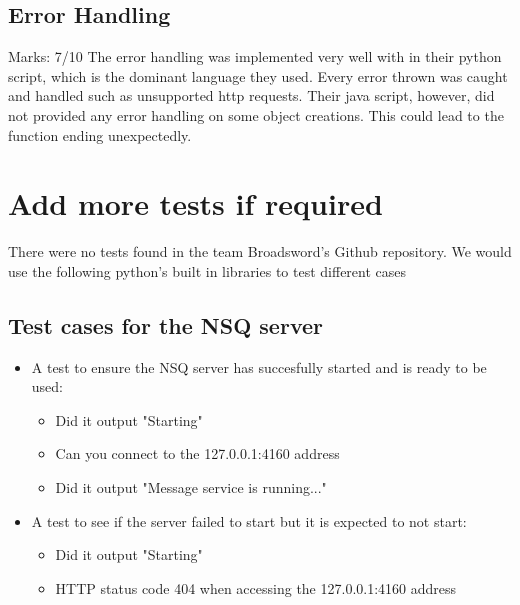 \documentclass[11pt]{article}
\begin{document}
	\subsection{Error Handling}
	    	 Marks: 7/10
The error handling was implemented very well with in their python script, which is the dominant language they used. Every error thrown was caught and handled such as unsupported http requests. Their java script, however, did not provided any error handling on some object creations. This could lead to the function ending unexpectedly.


\section{Add more tests if required}
	There were no tests found in the team Broadsword's Github repository. We would use the following python's built in libraries to test different cases
	\subsection{Test cases for the NSQ server}	
		\begin{itemize}
			\item A test to ensure the NSQ server has succesfully started and is ready to be used:
				\begin{itemize}
					\item Did it output "Starting"
					\item Can you connect to the 127.0.0.1:4160 address
					\item Did it output "Message service is running..."
				\end{itemize}
			\item A test to see if the server failed to start but it is expected to not start:
				\begin{itemize}
					\item Did it output "Starting"
					\item HTTP status code 404 when accessing the 127.0.0.1:4160 address
				\end{itemize}
			\end{itemize}
\end{document}
